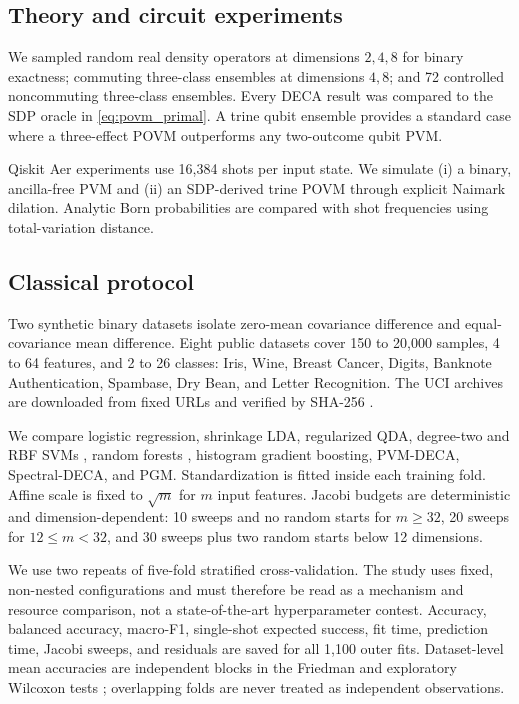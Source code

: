 \documentclass[10pt,twocolumn]{article}
\theoremstyle{definition}
\theoremstyle{remark}
\begin{document}
\subsection{Theory and circuit experiments}

We sampled random real density operators at dimensions $2,4,8$ for binary
exactness; commuting three-class ensembles at dimensions $4,8$; and 72
controlled noncommuting three-class ensembles.  Every DECA result was compared
to the SDP oracle in \cref{eq:povm_primal}.  A trine qubit ensemble provides a
standard case where a three-effect POVM outperforms any two-outcome qubit PVM.

Qiskit Aer experiments use 16,384 shots per input state.  We simulate (i) a
binary, ancilla-free PVM and (ii) an SDP-derived trine POVM through explicit
Naimark dilation.  Analytic Born probabilities are compared with shot
frequencies using total-variation distance.

\subsection{Classical protocol}

Two synthetic binary datasets isolate zero-mean covariance difference and
equal-covariance mean difference.  Eight public datasets cover 150 to 20,000
samples, 4 to 64 features, and 2 to 26 classes: Iris, Wine, Breast Cancer,
Digits, Banknote Authentication, Spambase, Dry Bean, and Letter Recognition.
The UCI archives are downloaded from fixed URLs and verified by SHA-256
\cite{uci2019,banknoteuci,spambaseuci,drybeanuci,letteruci}.

We compare logistic regression, shrinkage LDA, regularized QDA, degree-two and
RBF SVMs \cite{cortes1995}, random forests \cite{breiman2001}, histogram
gradient boosting, PVM-DECA, Spectral-DECA, and PGM.  Standardization is fitted
inside each training fold.  Affine scale is fixed to $\sqrt m$ for $m$ input
features.  Jacobi budgets are deterministic and dimension-dependent:
10 sweeps and no random starts for $m\ge32$, 20 sweeps for $12\le m<32$, and
30 sweeps plus two random starts below 12 dimensions.

We use two repeats of five-fold stratified cross-validation.  The study uses
fixed, non-nested configurations and must therefore be read as a mechanism and
resource comparison, not a state-of-the-art hyperparameter contest.
Accuracy, balanced accuracy, macro-F1, single-shot expected success, fit time,
prediction time, Jacobi sweeps, and residuals are saved for
all 1,100 outer fits.  Dataset-level mean accuracies are independent blocks in
the Friedman and exploratory Wilcoxon tests \cite{demsar2006}; overlapping
folds are never treated as independent observations.
\end{document}
